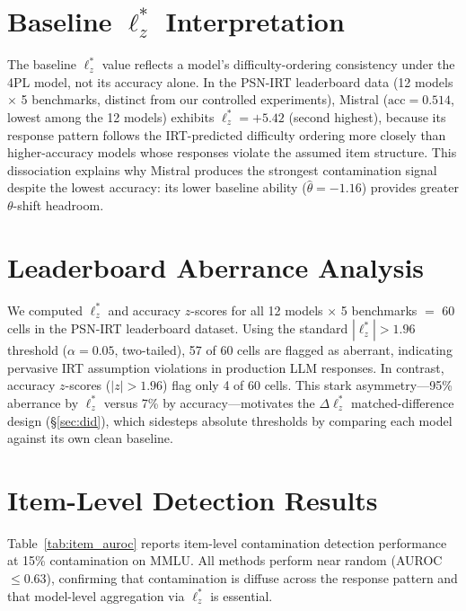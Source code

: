 \section{Baseline $\ell_z^*$ Interpretation}
\label{app:baseline_meaning}

The baseline $\ell_z^*$ value reflects a model's difficulty-ordering consistency under the 4PL model, not its accuracy alone.
In the PSN-IRT leaderboard data (12 models $\times$ 5 benchmarks, distinct from our controlled experiments), Mistral ($\text{acc}{=}0.514$, lowest among the 12 models) exhibits $\ell_z^*{=}{+}5.42$ (second highest), because its response pattern follows the IRT-predicted difficulty ordering more closely than higher-accuracy models whose responses violate the assumed item structure.
This dissociation explains why Mistral produces the strongest contamination signal despite the lowest accuracy: its lower baseline ability ($\hat{\theta}{=}{-}1.16$) provides greater $\theta$-shift headroom.

\section{Leaderboard Aberrance Analysis}
\label{app:leaderboard_aberrance}

We computed $\ell_z^*$ and accuracy $z$-scores for all 12 models $\times$ 5 benchmarks $=$ 60 cells in the PSN-IRT leaderboard dataset.
Using the standard $|\ell_z^*| > 1.96$ threshold ($\alpha{=}0.05$, two-tailed), 57 of 60 cells are flagged as aberrant, indicating pervasive IRT assumption violations in production LLM responses.
In contrast, accuracy $z$-scores ($|z| > 1.96$) flag only 4 of 60 cells.
This stark asymmetry---95\% aberrance by $\ell_z^*$ versus 7\% by accuracy---motivates the $\Delta\ell_z^*$ matched-difference design (\S\ref{sec:did}), which sidesteps absolute thresholds by comparing each model against its own clean baseline.

\section{Item-Level Detection Results}
\label{app:item_auroc}

Table~\ref{tab:item_auroc} reports item-level contamination detection performance at 15\% contamination on MMLU.
All methods perform near random (AUROC $\leq 0.63$), confirming that contamination is diffuse across the response pattern and that model-level aggregation via $\ell_z^*$ is essential.

